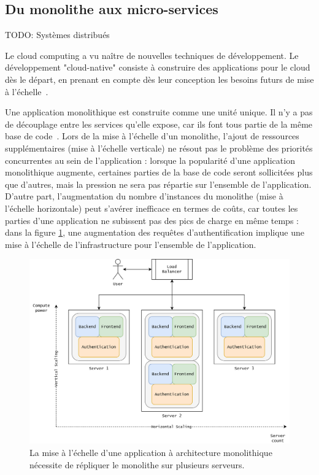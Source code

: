 \subsection{Du monolithe aux micro-services}

TODO: Systèmes distribués

Le cloud computing a vu naître de nouvelles techniques de développement. Le développement "cloud-native" consiste à construire des applications pour le cloud dès le départ, en prenant en compte dès leur conception les besoins futurs de mise à l'échelle~\cite{dragoniMicroservicesHowMake2018, martinfowler2014microservices}.

Une application monolithique est construite comme une unité unique. Il n'y a pas de découplage entre les services qu'elle expose, car ils font tous partie de la même base de code~\cite{villamizarEvaluatingMonolithicMicroservice2015}. Lors de la mise à l'échelle d'un monolithe, l'ajout de ressources supplémentaires (mise à l'échelle verticale) ne résout pas le problème des priorités concurrentes au sein de l'application : lorsque la popularité d'une application monolithique augmente, certaines parties de la base de code seront sollicitées plus que d'autres, mais la pression ne sera pas répartie sur l'ensemble de l'application. D'autre part, l'augmentation du nombre d'instances du monolithe (mise à l'échelle horizontale) peut s'avérer inefficace en termes de coûts, car toutes les parties d'une application ne subissent pas des pics de charge en même temps : dans la figure \ref{fig:scaling-monolith}, une augmentation des requêtes d'authentification implique une mise à l'échelle de l'infrastructure pour l'ensemble de l'application.

\begin{figure}[ht]
    \centering
	\includegraphics[width=\textwidth]{2_Chapitre2/figures/scaling-monolith.png}
	\caption{La mise à l'échelle d'une application à architecture monolithique nécessite de répliquer le monolithe sur plusieurs serveurs.}
	\label{fig:scaling-monolith}
\end{figure}

